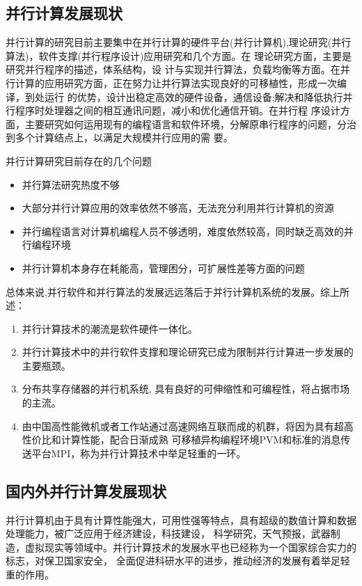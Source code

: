 \subsection{并行计算发展现状}
    并行计算的研究目前主要集中在并行计算的硬件平台(并行计算机),理论研究(并行算法)，软件支撑(并行程序设计)应用研究和几个方面。在
理论研究方面，主要是研究并行程序的描述，体系结构，设
计与实现并行算法，负载均衡等方面。在并行计算的应用研究方面，正在努力让并行算法实现良好的可移植性，形成一次编译，到处运行
的优势，设计出稳定高效的硬件设备，通信设备;解决和降低执行并行程序时处理器之间的相互通讯问题，减小和优化通信开销。在并行程
序设计方面，主要研究如何运用现有的编程语言和软件环境，分解原串行程序的问题，分治到多个计算结点上，以满足大规模并行应用的需
要\cite{Chenguoliang}。

    并行计算研究目前存在的几个问题
    \begin{itemize}   
    \item 并行算法研究热度不够
    \item 大部分并行计算应用的效率依然不够高，无法充分利用并行计算机的资源
    \item 并行编程语言对计算机编程人员不够透明，难度依然较高，同时缺乏高效的并行编程环境
    \item 并行计算机本身存在耗能高，管理困分，可扩展性差等方面的问题
    \end{itemize}

总体来说,并行软件和并行算法的发展远远落后于并行计算机系统的发展。综上所述：

\begin{enumerate}
\item 并行计算技术的潮流是软件硬件一体化。
\item 并行计算技术中的并行软件支撑和理论研究已成为限制并行计算进一步发展的主要瓶颈。
\item 分布共享存储器的并行机系统, 具有良好的可伸缩性和可编程性，将占据市场的主流。
\item 由中国高性能微机或者工作站通过高速网络互联而成的机群，将因为具有超高性价比和计算性能，配合日渐成熟
可移植异构编程环境PVM和标准的消息传送平台MPI，称为并行计算技术中举足轻重的一环。
\end{enumerate}

\subsection{国内外并行计算发展现状}
    并行计算机由于具有计算性能强大，可用性强等特点，具有超级的数值计算和数据处理能力，被广泛应用于经济建设，科技建设，
科学研究，天气预报，武器制造，虚拟现实等领域中。并行计算技术的发展水平也已经称为一个国家综合实力的标志，对保卫国家安全，
全面促进科研水平的进步，推动经济的发展有着举足轻重的作用。
    
